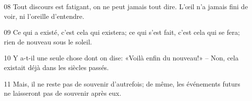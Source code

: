 
08 Tout discours est fatigant, on ne peut jamais tout dire. L’œil n’a jamais fini de voir, ni l’oreille d’entendre.

09 Ce qui a existé, c’est cela qui existera; ce qui s’est fait, c’est cela qui se fera; rien de nouveau sous le soleil.

10 Y a-t-il une seule chose dont on dise: «Voilà enfin du nouveau!» – Non, cela existait déjà dans les siècles passés.

11 Mais, il ne reste pas de souvenir d’autrefois; de même, les événements futurs ne laisseront pas de souvenir après eux.
